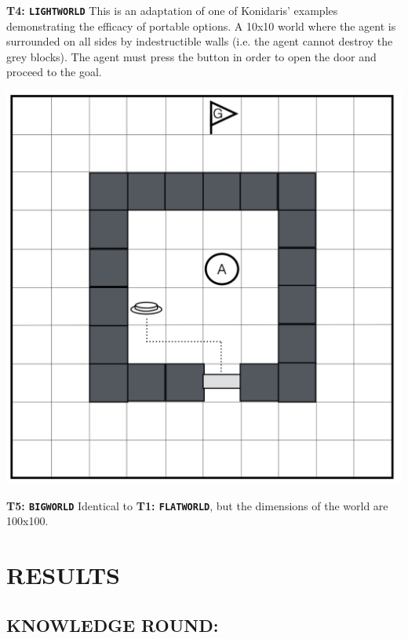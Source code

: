 \documentclass[]{article}
\begin{document}

{\bf T4: \texttt{LIGHTWORLD}} This is an adaptation of one of Konidaris' examples demonstrating the efficacy of portable options. A 10x10 world where the agent is surrounded on all sides by indestructible walls (i.e. the agent cannot destroy the grey blocks). The agent must press the button in order to open the door and proceed to the goal.

\begin{center}
\includegraphics[scale=0.23]{figures/lightworld.png}
\end{center}


{\bf T5: \texttt{BIGWORLD}} Identical to {\bf T1: \texttt{FLATWORLD}}, but the dimensions of the world are 100x100.



\section{RESULTS}

\subsection{KNOWLEDGE ROUND:}
\end{document}
